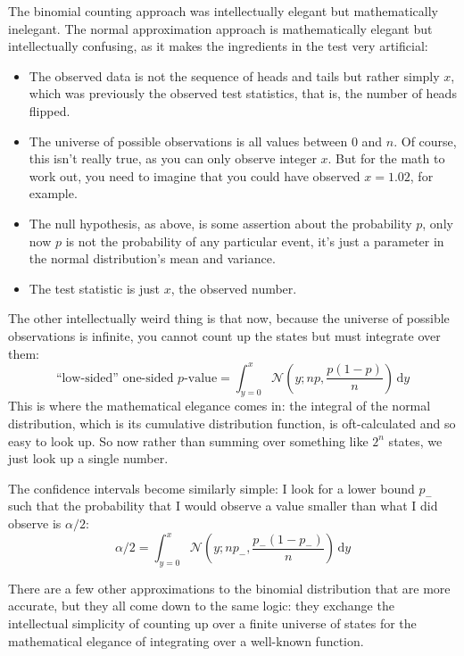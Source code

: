 The binomial counting approach was intellectually elegant but mathematically
inelegant. The normal approximation approach is mathematically elegant but
intellectually confusing, as it makes the ingredients in the test very
artificial:
\begin{itemize}
    \item The observed data is not the sequence of heads and tails but rather simply $x$, which was previously the observed test statistics, that is, the number of heads flipped.
    \item The universe of possible observations is all values between $0$ and $n$. Of course, this isn't really true, as you can only observe integer $x$. But for the math to work out, you need to imagine that you could have observed $x = 1.02$, for example.
    \item The null hypothesis, as above, is some assertion about the probability $p$, only now $p$ is not the probability of any particular event, it's just a parameter in the normal distribution's mean and variance.
    \item The test statistic is just $x$, the observed number.
\end{itemize}

The other intellectually weird thing is that now, because the universe of possible observations is infinite, you cannot count up the states but must integrate over them:
\begin{equation}
    \text{``low-sided'' one-sided $p$-value} = \int_{y=0}^x \mathcal{N}\left(y; np, \frac{p(1-p)}{n} \right) \,\mathrm{d}y
\end{equation}
This is where the mathematical elegance comes in: the integral of the normal distribution, which is its cumulative distribution function, is oft-calculated and so easy to look up. So now rather than summing over something like $2^n$ states, we just look up a single number.

The confidence intervals become similarly simple: I look for a lower bound $p_-$ such that the probability that I would observe a value smaller than what I did observe is $\alpha/2$:
\begin{equation}
    \alpha/2 = \int_{y=0}^x \mathcal{N} \left(y; np_-, \frac{p_-(1-p_-)}{n} \right) \,\mathrm{d}y
\end{equation}

There are a few other approximations to the binomial distribution that are more
accurate, but they all come down to the same logic: they exchange the
intellectual simplicity of counting up over a finite universe of states for the
mathematical elegance of integrating over a well-known function.

